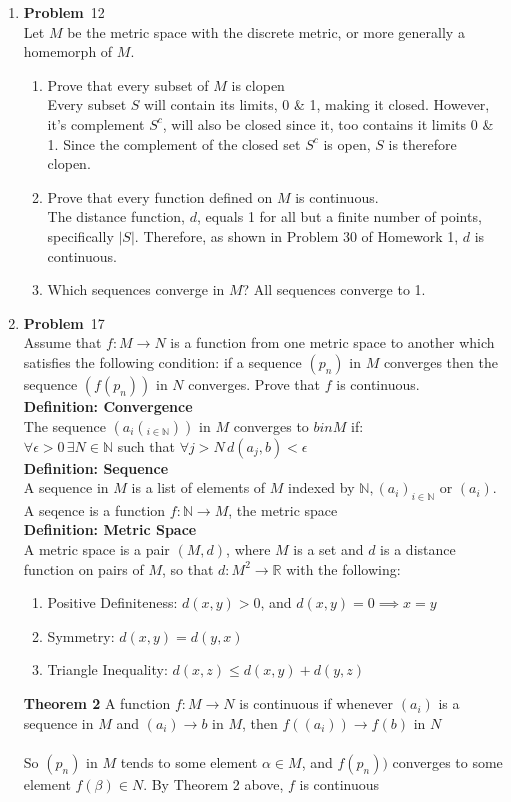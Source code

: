 \documentclass[12pt]{amsart}
\newcommand{\benu}{\begin{enumerate}}
\newcommand{\eenu}{\end{enumerate}}
\theoremstyle{definition}
\newcommand{\mbR}{\mathbb{R}}
\newcommand{\mbN}{\mathbb{N}}
\newcommand{\itep}{\item {\bfseries Problem}\ }
\begin{document}
\begin{enumerate}[series=p]
\newpage

\itep 12\\
Let $M$ be the metric space with the discrete metric, or more generally a homemorph of $M$.
\benu
\item Prove that every subset of $M$ is clopen\\
Every subset $S$ will contain its limits, 0 \& 1, making it closed.  However, it's complement $S^c$, will also be closed since it, too contains it limits 0 \& 1.  Since the complement of the closed set $S^c$ is open, $S$ is therefore clopen. 
\item Prove that every function defined on $M$ is continuous.\\
The distance function, $d$, equals 1 for all but a finite number of points, specifically $|S|$.  Therefore, as shown in Problem 30 of Homework 1, $d$ is continuous.
\item Which sequences converge in $M$?
All sequences converge to 1.
\eenu

\newpage

\itep 17 \\
Assume that $f:M \rightarrow N$ is a function from one metric space to another which satisfies the following condition:  if a sequence $(p_n)$ in $M$ converges then the sequence $(f(p_n))$ in $N$ converges.  Prove that $f$ is continuous.
\\
\textbf{Definition: Convergence}\\
The sequence $(a_i(_{i \in \mbN}))$ in $M$ converges to $b in M$ if:\\
$\forall \epsilon > 0 \, \exists N \in \mbN$ such that $\forall j>N \, d(a_j,b) < \epsilon$
\\
\textbf{Definition: Sequence}\\
A sequence in $M$ is a list of elements of $M$ indexed by $\mbN, (a_i)_{i \in \mbN}$ or $(a_i)$.  A seqence is a function $f : \mbN \to M$, the metric space\\
\textbf{Definition: Metric Space}\\
A metric space is a pair $(M, d)$, where $M$ is a set and $d$ is a distance function on pairs of $M$, so that $d : M^2 \to \mbR$ with the following:
\benu
\item Positive Definiteness: $d(x, y) > 0$, and $d(x, y) = 0 \implies x = y$
\item Symmetry: $d(x, y) = d(y, x)$
\item Triangle Inequality: $d(x, z) \leq d(x,y) + d(y,z)$
\eenu
\textbf{Theorem 2}
A function $f: M \to N$ is continuous if whenever $(a_i)$ is a sequence in $M$ and $(a_i) \to b$ in $M$, then $f((a_i)) \to f(b)$ in $N$\\
\\
So $(p_n)$ in $M$ tends to some element $\alpha \in M$, and $f(p_n))$ converges to some element $f(\beta) \in N$.  By Theorem 2 above, $f$ is continuous 
\newpage


\end{enumerate}
\end{document}
